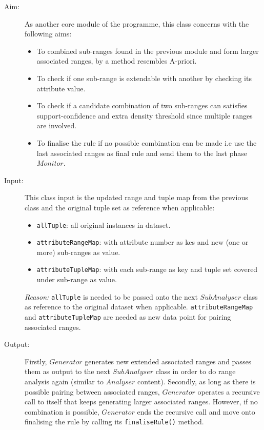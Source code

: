 \begin{description}

\item[Aim: ] As another core module of the programme, this class concerns with the following aims:
\begin{itemize}
	\item{To combined sub-ranges found in the previous module and form larger associated ranges, by a method resembles A-priori.} 
	\item{To check if one sub-range is extendable with another by checking its attribute value.} 
	\item{To check if a candidate combination of two sub-ranges can satisfies support-confidence and extra density threshold since multiple ranges are involved.} 
	\item{To finalise the rule if no possible combination can be made i.e use the last associated ranges as final rule and send them to the last phase $Monitor$.} 
\end{itemize}

\item[Input: ] This class input is the updated range and tuple map from the previous class and the original tuple set as reference when applicable:
\begin{itemize}
	\item{\texttt{allTuple}:  all original instances in dataset.} 
	\item{\texttt{attributeRangeMap}: with attribute number as kes and new (one or more) sub-ranges as value.}
	\item{\texttt{attributeTupleMap}: with each sub-range as key and tuple set covered under sub-range as value.}
\end{itemize}

\textit{Reason: } \texttt{allTuple} is needed to be passed onto the next $SubAnalyser$ class as reference to the original dataset when applicable. \texttt{attributeRangeMap} and \texttt{attributeTupleMap} are needed as new data point for pairing associated ranges.

\item[Output: ] Firstly, $Generator$ generates new extended associated ranges and passes them as output to the next $SubAnalyser$ class in order to do range analysis again (similar to $Analyser$ content). Secondly, as long as there is possible pairing between associated ranges, $Generator$ operates a recursive call to itself that keeps generating larger associated ranges. However, if no combination is possible, $Generator$ ends the recursive call and move onto finalising the rule by calling its \texttt{finaliseRule()} method. 
  

\end{description}
